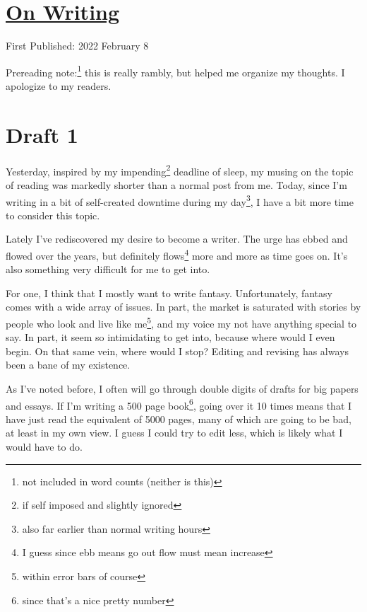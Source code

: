 \documentclass[12pt]{article}[titlepage]
\newcommand{\1}{\={a}}
\newcommand{\2}{\={e}}
\newcommand{\3}{\={\i}}
\newcommand{\4}{\=o}
\newcommand{\5}{\=u}
\newcommand{\6}{\={A}}
\renewcommand{\,}{\textsuperscript{,}}
\begin{document}
\doublespacing
\section{\href{writing.html}{On Writing}}
First Published: 2022 February 8

Prereading note:\footnote{not included in word counts (neither is this)} this is really rambly, but helped me organize my thoughts. I apologize to my readers.

\section{Draft 1}
Yesterday, inspired by my impending\footnote{if self imposed and slightly ignored} deadline of sleep, my musing on the topic of reading was markedly shorter than a normal post from me.
Today, since I'm writing in a bit of self-created downtime during my day\footnote{also far earlier than normal writing hours}, I have a bit more time to consider this topic.

Lately I've rediscovered my desire to become a writer.
The urge has ebbed and flowed over the years, but definitely flows\footnote{I guess since ebb means go out flow must mean increase} more and more as time goes on.
It's also something very difficult for me to get into.

For one, I think that I mostly want to write fantasy.
Unfortunately, fantasy comes with a wide array of issues.
In part, the market is saturated with stories by people who look and live like me\footnote{within error bars of course}, and my voice my not have anything special to say.
In part, it seem so intimidating to get into, because where would I even begin.
On that same vein, where would I stop?
Editing and revising has always been a bane of my existence.

As I've noted before, I often will go through double digits of drafts for big papers and essays.
If I'm writing a 500 page book\footnote{since that's a nice pretty number}, going over it 10 times means that I have just read the equivalent of 5000 pages, many of which are going to be bad, at least in my own view.
I guess I could try to edit less, which is likely what I would have to do.
\end{document}
